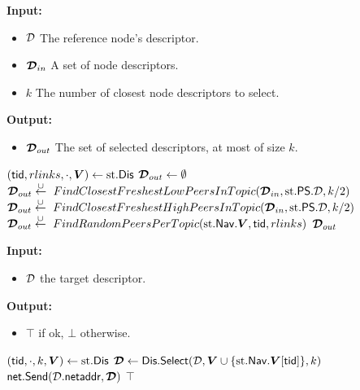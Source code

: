 \begin{algorithm}[H]
\caption{\disselect. Dissemination selection algorithm, approximating the caller's outgoing links in the target structure.}
\label{alg:disselect}
\textbf{Input:}
\begin{itemize}
\vspace{-.8em}
\itemsep0em 
    \item $\mathcal{D}$ The reference node's descriptor.
    \item $\boldsymbol{\mathcal{D}}_{in}$ A set of node descriptors.
    \item $k$ The number of closest node descriptors to select.
\end{itemize}
\textbf{Output:}
\begin{itemize}
\vspace{-.8em}
\itemsep0em 
    \item $\boldsymbol{\mathcal{D}}_{out}$ The set of selected descriptors, at most of size $k$.
\end{itemize}
\begin{algorithmic}
    \State $(\mathsf{tid},rlinks,\cdot,\boldsymbol{V}) \gets \text{st}.\mathsf{Dis}$
    \State $\boldsymbol{\mathcal{D}}_{out} \gets \emptyset$
    \State $\boldsymbol{\mathcal{D}}_{out} \stackrel{\cup}{\gets}~FindClosestFreshestLowPeersInTopic(\boldsymbol{\mathcal{D}}_{in},\text{st}.\mathsf{PS}.\mathcal{D},k/2)$
    \State $\boldsymbol{\mathcal{D}}_{out} \stackrel{\cup}{\gets}~FindClosestFreshestHighPeersInTopic(\boldsymbol{\mathcal{D}}_{in},\text{st}.\mathsf{PS}.\mathcal{D},k/2)$
    \State $\boldsymbol{\mathcal{D}}_{out} \stackrel{\cup}{\gets}~FindRandomPeersPerTopic(\text{st}.\mathsf{Nav}.\boldsymbol{V},\mathsf{tid},rlinks)$
    \State \Return $\boldsymbol{\mathcal{D}}_{out}$ 
\end{algorithmic}
\end{algorithm}

\begin{algorithm}[H]
\caption{\dissend}
\label{alg:dissend}
\textbf{Input:}
\begin{itemize}
\vspace{-.8em}
\itemsep0em 
    \item $\mathcal{D}$ the target descriptor.
\end{itemize}
\textbf{Output:}
\begin{itemize}
\vspace{-.8em}
\itemsep0em 
    \item $\top$ if ok, $\bot$ otherwise.
\end{itemize}
\begin{algorithmic}
    \State $(\mathsf{tid},\cdot,k,\boldsymbol{V}) \gets \text{st}.\mathsf{Dis}$
    \State $\boldsymbol{\mathcal{D}} \gets \mathsf{Dis}.\mathsf{Select}(\mathcal{D},\boldsymbol{V} \cup \lbrace \text{st}.\mathsf{Nav}.\boldsymbol{V}[\mathsf{tid}] \rbrace,k)$
    \State $\mathsf{net}.\mathsf{Send}(\mathcal{D}.\mathsf{netaddr},\boldsymbol{\mathcal{D}})$
    \State \Return $\top$
\end{algorithmic}
\end{algorithm}

